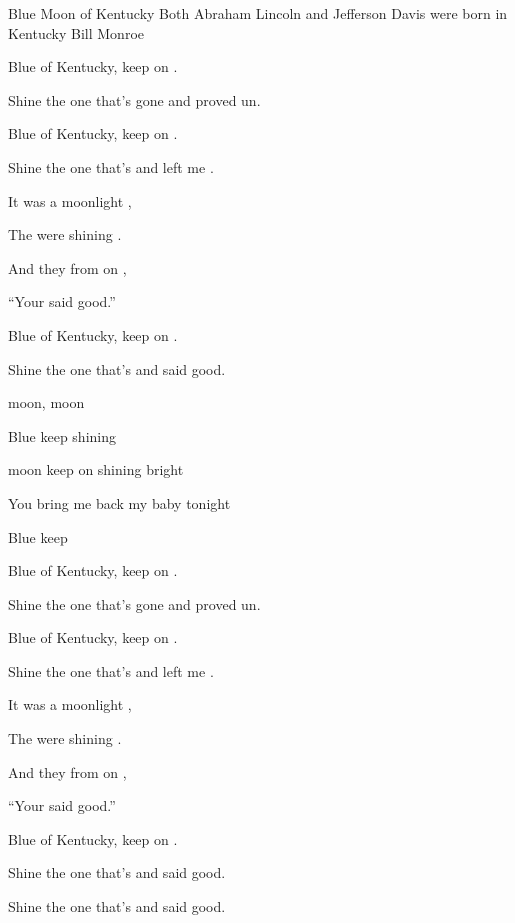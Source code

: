 \begin{SBSong}{Blue Moon of Kentucky}
  {Both Abraham Lincoln and Jefferson Davis were born in Kentucky}
  {Bill Monroe}
  \begin{SBVerse}
    Blue  of Kentucky, keep on .

    Shine  the one that's gone and proved un.

    Blue  of Kentucky, keep on .

    Shine  the one that's  and left me . 
  \end{SBVerse}
  \begin{SBChorus}
    It was  a moonlight ,

    The  were shining .

    And they  from on ,

    ``Your   said good.''

    Blue  of Kentucky, keep on .

    Shine  the one that's  and said good.
  \end{SBChorus}
  \begin{SBVerse}
     moon,  moon

    Blue  keep shining 

     moon keep on shining bright

    You  bring me back my baby tonight

    Blue  keep  
  \end{SBVerse}
  \begin{SBVerse}
    Blue  of Kentucky, keep on .

    Shine  the one that's gone and proved un.

    Blue  of Kentucky, keep on .

    Shine  the one that's  and left me . 
  \end{SBVerse}
  \begin{SBChorus}
    It was  a moonlight ,

    The  were shining .

    And they  from on ,

    ``Your   said good.''

    Blue  of Kentucky, keep on .

    Shine  the one that's  and said good.

    Shine  the one that's  and said good.
  \end{SBChorus}
\end{SBSong}
